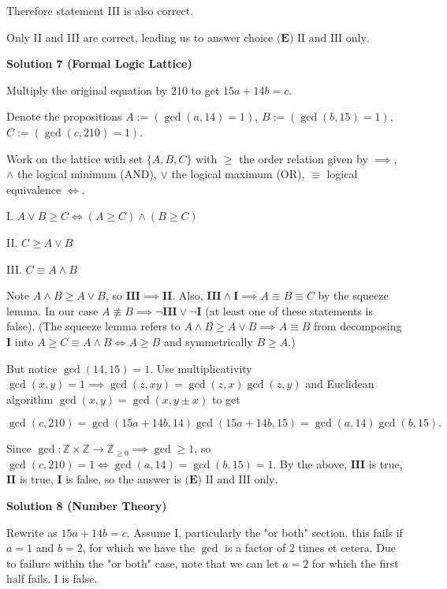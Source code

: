 \begin{enumerate}
 Therefore statement III is also correct.

 Only II and III are correct, leading us to answer choice $\boxed{\textbf{(E) }\text{II and III only}}.$




\textbf{Solution 7 (Formal Logic Lattice)}

Multiply the original equation by $210$ to get $15a+14b=c$.

 Denote the propositions $A:=(\gcd(a,14)=1)$, $B:=(\gcd(b,15)=1)$, $C:=(\gcd(c,210)=1)$.

 Work on the lattice with set $\{ A,B,C \}$ with $\ge$ the order relation given by $\implies$, $\land$ the logical minimum (AND), $\lor$ the logical maximum (OR), $\equiv$ logical equivalence $\iff$.

 I. $A\lor B\ge C\iff (A\ge C)\land (B\ge C)$

 II. $C\ge A\lor B$

 III. $C\equiv A\land B$

 Note $A\land B\ge A\lor B$, so $\mathbf{III}\implies \mathbf{II}$. Also, $\mathbf{III}\land\mathbf{I}\implies A\equiv B\equiv C$ by the squeeze lemma. In our case $A\not\equiv B\implies\neg \mathbf{III}\lor \neg \mathbf{I}$ (at least one of these statements is false). (The squeeze lemma refers to $A\land B\ge A\lor B\implies A\equiv B$ from decomposing $\mathbf{I}$ into $A\ge C\equiv A\land B \iff A\ge B$ and symmetrically $B\ge A$.)

 But notice $\gcd(14,15)=1$. Use multiplicativity $\gcd(x,y)=1\implies \gcd(z,xy)=\gcd(z,x)\gcd(z,y)$ and Euclidean algorithm $\gcd(x,y)=\gcd(x,y\pm x)$ to get

 
 \[\gcd(c,210)=\gcd(15a+14b,14)\gcd(15a+14b,15)=\gcd(a,14)\gcd(b,15).\]

 Since $\gcd: \mathbb{Z}\times \mathbb{Z}\to \mathbb{Z}_{\ge 0} \implies \gcd\ge 1$, so $\gcd(c,210)=1\iff \gcd(a,14)=\gcd(b,15)=1$. By the above, $\mathbf{III}$ is true, $\mathbf{II}$ is true, $\mathbf{I}$ is false, so the answer is $\boxed{\textbf{(E) }\text{II and III only}}$.

 



\textbf{Solution 8 (Number Theory)}

Rewrite as $15a + 14b = c$. Assume I, particularly the "or both" section. this fails if $a = 1$ and $b = 2$, for which we have the $\gcd$ is a factor of 2 times et cetera. Due to failure within the "or both" case, note that we can let $a = 2$ for which the first half fails. I is false.


\end{enumerate}
